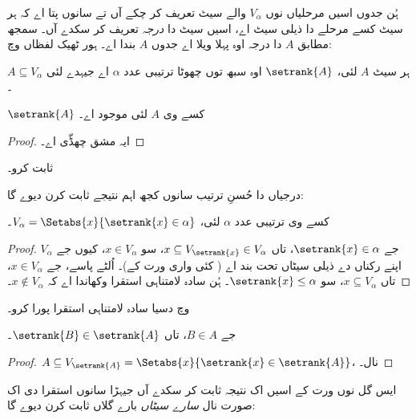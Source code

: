 \documentclass[../../../include/open-logic-section]{subfiles}
\begin{document}

ہُن جدوں اسیں مرحلیاں نوں $V_\alpha$ والے سیٹ تعریف کر چکے آں تے سانوں
پتا اے کہ ہر سیٹ کسے مرحلے دا ذیلی سیٹ اے، اسیں سیٹ دا \emph{درجہ}
تعریف کر سکدے آں۔ سمجھ مطابق $A$ دا درجہ اوہ پہلا ویلا اے جدوں $A$
بندا اے۔ ہور ٹھیک لفظاں وچ:

\begin{defn}
ہر سیٹ $A$ لئی، $\setrank{A}$ اوہ سبھ توں چھوٹا ترتیبی عدد $\alpha$ اے
جیہدے لئی $A \subseteq V_\alpha$۔
\end{defn}
\begin{prop}
	$\setrank{A}$ کسے وی $A$ لئی موجود اے۔
\end{prop}
\begin{proof}
	ایہ مشق چھڈّی اے۔
\end{proof}
\begin{prob}
	 ثابت کرو۔
\end{prob}
\noindent
درجیاں دا حُسنِ ترتیب سانوں کجھ اہم نتیجے ثابت کرن دیوے گا:
\begin{prop}
کسے وی ترتیبی عدد $\alpha$ لئی، $V_\alpha = \Setabs{x}{\setrank{x} \in \alpha}$۔
\end{prop}

\begin{proof}
جے $\setrank{x} \in \alpha$، تاں $x \subseteq V_{\setrank{x}} \in V_\alpha$،
سو $x \in V_\alpha$، کیوں جے $V_\alpha$ اپنے رکناں دے ذیلی سیٹاں تحت
بند اے ( کئی واری ورت کے)۔
اُلٹے پاسے، جے $x \in V_\alpha$، تاں $x \subseteq V_\alpha$، سو
$\setrank{x} \leq \alpha$۔ ہُن سادہ لامتناہی استقرا وکھاندا اے کہ
$x \notin V_\alpha$۔
\end{proof}
\begin{prob}
	 وچ دسیا سادہ لامتناہی استقرا پورا کرو۔
\end{prob}

\begin{prop}
جے $B \in A$، تاں $\setrank{B} \in \setrank{A}$۔
\end{prop}

\begin{proof}
$A \subseteq V_{\setrank{A}} = \Setabs{x}{\setrank{x} \in \setrank{A}}$،
 نال۔
\end{proof}
\noindent
ایس گل نوں ورت کے اسیں اک نتیجہ ثابت کر سکدے آں جیہڑا سانوں استقرا دی اک
صورت نال \emph{سارے سیٹاں} بارے گلاں ثابت کرن دیوے گا:
\end{document}
